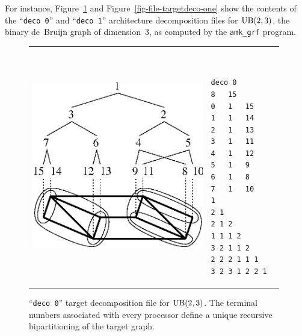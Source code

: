 For instance, Figure~\ref{fig-file-targetdeco-zero} and
Figure~\ref{fig-file-targetdeco-one} show the contents of the
``\texttt{deco 0}'' and ``\texttt{deco 1}'' architecture decomposition
files for ${\rm UB}(2,3)$, the binary de~Bruijn graph of dimension~$3$, as
computed by the \texttt{amk\_grf} program.
\begin{figure}[hbt]
\begin{tabular}{p{0.69\linewidth}@{}p{0.29\linewidth}}
\begin{center}
\parbox[t]{0.9\linewidth}{\vspace{0pt}\includegraphics[width=0.7\linewidth]{s_f_d.ps}}
\end{center}
&
\begin{center}
{\renewcommand{\baselinestretch}{1.05}
\footnotesize\tt
\begin{verbatim}
deco 0
8	15
0	1	15
1	1	14
2	1	13
3	1	11
4	1	12
5	1	9
6	1	8
7	1	10
1
2 1
2 1 2
1 1 1 2
3 2 1 1 2
2 2 2 1 1 1
3 2 3 1 2 2 1
\end{verbatim}
}
\end{center}
\end{tabular}
\caption{``\texttt{deco 0}'' target decomposition file for ${\rm UB}(2,3)$.
         The terminal numbers associated with every processor define a unique
         recursive bipartitioning of the target graph.}
\label{fig-file-targetdeco-zero}
\end{figure}

